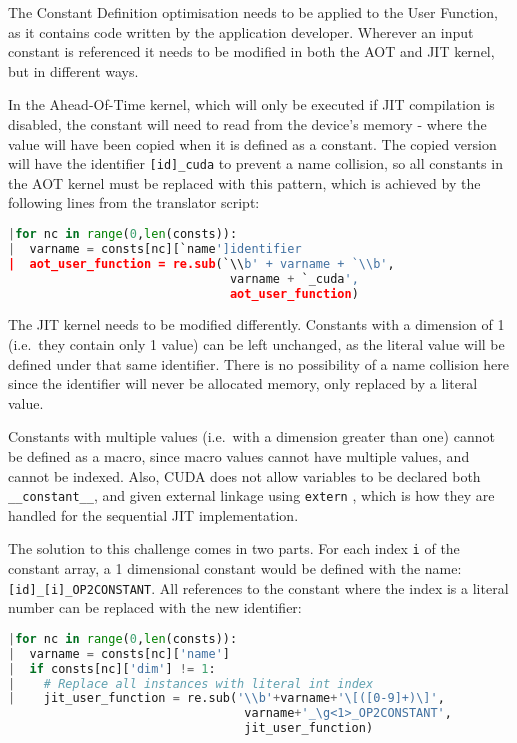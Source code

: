  The Constant Definition optimisation needs to be applied to the User Function, as it contains code written by the application developer. Wherever an input constant is referenced it needs to be modified in both the AOT and JIT kernel, but in different ways.

In the Ahead-Of-Time kernel, which will only be executed if JIT compilation is disabled, the constant will need to read from the device's memory - where the value will have been copied when it is defined as a constant. The copied version will have the identifier \verb|[id]_cuda| to prevent a name collision, so all constants in the AOT kernel must be replaced with this pattern, which is achieved by the following lines from the translator script:\\
\begin{lstlisting}[backgroundcolor = \color{lightgray!20}, language=Python]
|for nc in range(0,len(consts)):
|  varname = consts[nc][`name']identifier
|  aot_user_function = re.sub(`\\b' + varname + `\\b',
                               varname + `_cuda',
                               aot_user_function)
\end{lstlisting}

The JIT kernel needs to be modified differently. Constants with a dimension of 1 (i.e.\ they contain only 1 value) can be left unchanged, as the literal value will be defined under that same identifier. There is no possibility of a name collision here since the identifier will never be allocated memory, only replaced by a literal value.
\par
Constants with multiple values (i.e.\ with a dimension greater than one) cannot be defined as a macro, since macro values cannot have multiple values, and cannot be indexed. Also, CUDA does not allow variables to be declared both \verb|__constant__|, and given external linkage using \verb|extern| \cite[p126]{guide}, which is how they are handled for the sequential JIT implementation.
\par
The solution to this challenge comes in two parts. For each index \verb|i| of the constant array, a 1 dimensional constant would be defined with the name:\\ \verb|[id]_[i]_OP2CONSTANT|. All references to the constant where the index is a literal number can be replaced with the new identifier:
\begin{lstlisting}[backgroundcolor = \color{lightgray!20}, language=Python]
|for nc in range(0,len(consts)):
|  varname = consts[nc]['name']
|  if consts[nc]['dim'] != 1:
|    # Replace all instances with literal int index
|    jit_user_function = re.sub('\\b'+varname+'\[([0-9]+)\]',
                                 varname+'_\g<1>_OP2CONSTANT',
                                 jit_user_function)

\end{lstlisting}

